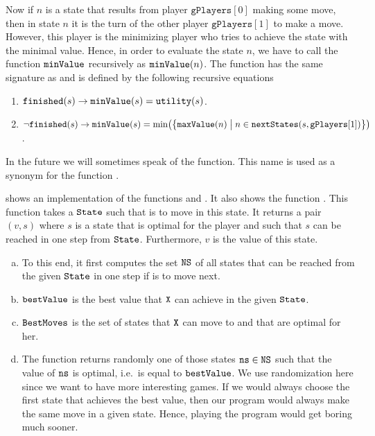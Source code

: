 Now if $n$ is a state that results from player $\texttt{gPlayers}[0]$ making some move, then in state $n$ it is the turn of the other player
$\mathtt{gPlayers}[1]$ to make a move.  However, this player is the minimizing player who tries to achieve the
state with the minimal value.
Hence, in order to evaluate the state $n$, we have to call the function $\texttt{minValue}$
recursively as $\texttt{minValue}(n)$.
The function  has the same signature as  and is defined by the following recursive equations
\begin{enumerate}
\item $\texttt{finished}(s) \rightarrow \texttt{minValue}(s) = \texttt{utility}(s)$. 
\item $\neg \texttt{finished}(s) \rightarrow 
       \texttt{minValue}(s) = \min\bigl(\bigl\{
                     \texttt{maxValue}(n) \bigm| n \in \texttt{nextStates}(s, \mathtt{gPlayers}[1])
                     \bigr\}\bigr)
      $.  
\end{enumerate}
In the future we will sometimes speak of the  function.  This name is used as a synonym for the
function . 


 shows an implementation of the functions  and
. It also shows the function . 
This function  takes a $\texttt{State}$ such that  is to move in this state.  It returns a pair
$(v,s)$ where $s$ is a state that is optimal for the player  and such
that $s$ can be reached in one step from $\texttt{State}$.  Furthermore, $v$ is the value of this state.
\begin{enumerate}[(a)]
\item To this end, it first computes the set $\texttt{NS}$ of all states that can be reached 
      from the given $\texttt{State}$ in one step if  is to move next.
\item $\texttt{bestValue}$ is the best value that $\texttt{X}$ can achieve in the given $\texttt{State}$.
\item $\texttt{BestMoves}$ is the set of states that  $\texttt{X}$ can move to and that are optimal
      for her.
\item The function returns randomly one of those states $\texttt{ns} \in \texttt{NS}$ such that 
      the value of $\texttt{ns}$ is optimal, i.e.~is equal to $\texttt{bestValue}$.
      We use randomization here since we want to have more interesting games.  If we would always choose
      the first state that achieves the best value, then our program would always make the same move in
      a given state.  Hence, playing the program would get boring much sooner.
\end{enumerate}


